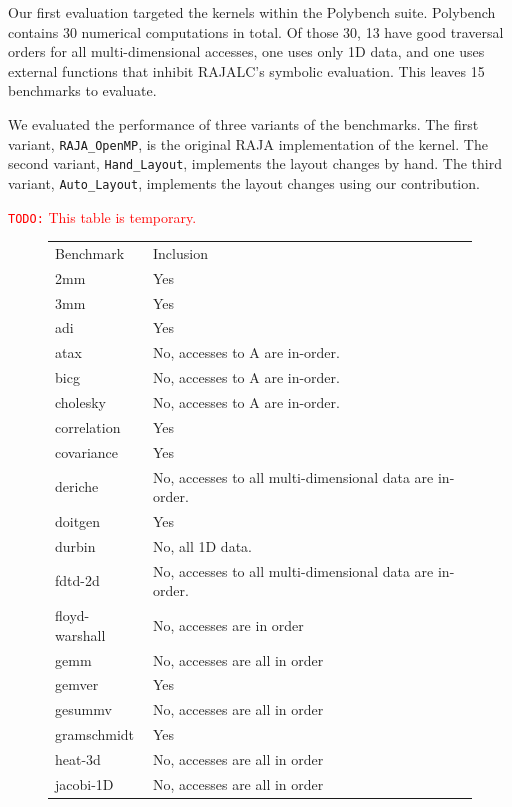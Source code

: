 \documentclass[sigconf, table]{acmart}
\newcommand{\todo}[1]{{\textcolor{red}{{\tt{TODO:}}\,\,#1 }}}
\begin{document}
Our first evaluation targeted the kernels within the Polybench suite. 
Polybench contains 30 numerical computations in total. 
Of those 30, 13 have good traversal orders for all multi-dimensional accesses, one uses only 1D data, and one uses external functions that inhibit RAJALC's symbolic evaluation.
This leaves 15 benchmarks to evaluate.

We evaluated the performance of three variants of the benchmarks.
The first variant, \verb.RAJA_OpenMP., is the original RAJA implementation of the kernel.
The second variant, \verb.Hand_Layout., implements the layout changes by hand.
The third variant, \verb.Auto_Layout., implements the layout changes using our contribution.



\todo{This table is temporary.}
\begin{figure}
\begin{tabular}{ll}
Benchmark   & Inclusion \\
2mm         & Yes          \\
3mm         & Yes          \\
adi         & Yes          \\
atax        & No, accesses to A are in-order.          \\
bicg        & No, accesses to A are in-order.          \\
cholesky    & No, accesses to A are in-order.          \\
correlation & Yes          \\
covariance  & Yes          \\
deriche     & No, accesses to all multi-dimensional data are in-order.          \\
doitgen     & Yes          \\
durbin      & No, all 1D data.          \\
fdtd-2d     & No, accesses to all multi-dimensional data are in-order.           \\
floyd-warshall & No, accesses are in order \\
gemm        &  No, accesses are all in order         \\
gemver      & Yes          \\
gesummv     & No, accesses are all in order          \\
gramschmidt & Yes          \\
heat-3d     & No, accesses are all in order            \\
jacobi-1D   & No, accesses are all in order           \\

\end{tabular}
\end{figure}
\end{document}
